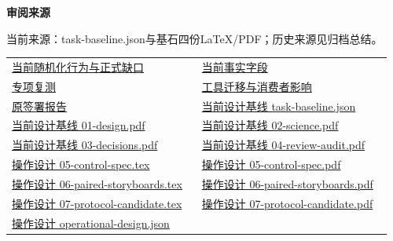 \documentclass[11pt,a4paper]{article}
\newcommand{\reviewsubsection}[1]{\par\Needspace{4\baselineskip}\vspace{4pt}\begin{center}{\titlelatin\titlecjk\bfseries\fontsize{12}{18}\selectfont #1}\end{center}}
\begin{document}
\begin{minipage}{\linewidth}
\reviewsubsection{3.4 审阅来源}
当前来源：task-\allowbreak{}baseline.json与基石四份LaTeX/\allowbreak{}PDF；历史来源见归档总结。


\begingroup\small\setlength{\tabcolsep}{4pt}\begin{tabular}{@{}p{0.48\linewidth}p{0.48\linewidth}@{}}
\href{file:///D:/Agent/srp/agent/tasks/X-01/outputs/current-randomization.md}{当前随机化行为与正式缺口} & \href{file:///D:/Agent/srp/agent/tasks/X-01/outputs/current-randomization.json}{当前事实字段}\\[4pt]
\href{file:///D:/Agent/srp/agent/tasks/X-01/evidence/verification.json}{专项复测} & \href{file:///D:/Agent/srp/agent/tasks/X-01/outputs/consumer-impact.md}{工具迁移与消费者影响}\\[4pt]
\href{file:///D:/Agent/srp/agent/validation/X-01_\%E7\%AC\%AC\%E4\%BA\%8C\%E4\%BA\%BA\%E5\%AE\%A1\%E6\%A0\%B8\%E6\%8A\%A5\%E5\%91\%8A_\%E5\%B7\%B2\%E7\%AD\%BE\%E7\%BD\%B2.md}{原签署报告} & \href{file:///D:/Agent/srp/agent/design/design-foundation-20261008/task-baseline.json}{当前设计基线 task-\allowbreak{}baseline.json}\\[4pt]
\href{file:///D:/Agent/srp/agent/design/design-foundation-20261008/01-design.pdf}{当前设计基线 01-\allowbreak{}design.pdf} & \href{file:///D:/Agent/srp/agent/design/design-foundation-20261008/02-science.pdf}{当前设计基线 02-\allowbreak{}science.pdf}\\[4pt]
\href{file:///D:/Agent/srp/agent/design/design-foundation-20261008/03-decisions.pdf}{当前设计基线 03-\allowbreak{}decisions.pdf} & \href{file:///D:/Agent/srp/agent/design/design-foundation-20261008/04-review-audit.pdf}{当前设计基线 04-\allowbreak{}review-\allowbreak{}audit.pdf}\\[4pt]
\href{file:///D:/Agent/srp/agent/design/design-foundation-20261008/05-control-spec.tex}{操作设计 05-\allowbreak{}control-\allowbreak{}spec.tex} & \href{file:///D:/Agent/srp/agent/design/design-foundation-20261008/05-control-spec.pdf}{操作设计 05-\allowbreak{}control-\allowbreak{}spec.pdf}\\[4pt]
\href{file:///D:/Agent/srp/agent/design/design-foundation-20261008/06-paired-storyboards.tex}{操作设计 06-\allowbreak{}paired-\allowbreak{}storyboards.tex} & \href{file:///D:/Agent/srp/agent/design/design-foundation-20261008/06-paired-storyboards.pdf}{操作设计 06-\allowbreak{}paired-\allowbreak{}storyboards.pdf}\\[4pt]
\href{file:///D:/Agent/srp/agent/design/design-foundation-20261008/07-protocol-candidate.tex}{操作设计 07-\allowbreak{}protocol-\allowbreak{}candidate.tex} & \href{file:///D:/Agent/srp/agent/design/design-foundation-20261008/07-protocol-candidate.pdf}{操作设计 07-\allowbreak{}protocol-\allowbreak{}candidate.pdf}\\[4pt]
\href{file:///D:/Agent/srp/agent/design/design-foundation-20261008/operational-design.json}{操作设计 operational-\allowbreak{}design.json} & \\[4pt]
\end{tabular}\endgroup\end{minipage}\par
\end{document}

